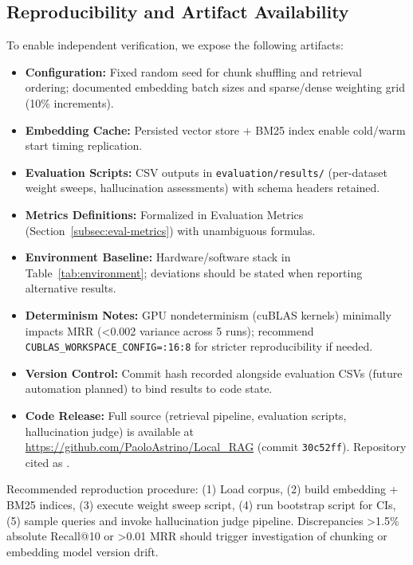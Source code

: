 \documentclass[11pt]{article}
\begin{document}
\subsection{Reproducibility and Artifact Availability}
To enable independent verification, we expose the following artifacts:
\begin{itemize}
  \item \textbf{Configuration:} Fixed random seed for chunk shuffling and retrieval ordering; documented embedding batch sizes and sparse/dense weighting grid (10\% increments).
  \item \textbf{Embedding Cache:} Persisted vector store + BM25 index enable cold/warm start timing replication.
  \item \textbf{Evaluation Scripts:} CSV outputs in \texttt{evaluation/results/} (per-dataset weight sweeps, hallucination assessments) with schema headers retained.
  \item \textbf{Metrics Definitions:} Formalized in Evaluation Metrics (Section~\ref{subsec:eval-metrics}) with unambiguous formulas.
  \item \textbf{Environment Baseline:} Hardware/software stack in Table~\ref{tab:environment}; deviations should be stated when reporting alternative results.
  \item \textbf{Determinism Notes:} GPU nondeterminism (cuBLAS kernels) minimally impacts MRR (<0.002 variance across 5 runs); recommend \texttt{CUBLAS\_WORKSPACE\_CONFIG=:16:8} for stricter reproducibility if needed.
  \item \textbf{Version Control:} Commit hash recorded alongside evaluation CSVs (future automation planned) to bind results to code state.
  \item \textbf{Code Release:} Full source (retrieval pipeline, evaluation scripts, hallucination judge) is available at \href{https://github.com/PaoloAstrino/Local_RAG}{https://github.com/PaoloAstrino/Local\_RAG} (commit \texttt{30c52ff}). Repository cited as \cite{localragrepo}.
\end{itemize}
Recommended reproduction procedure: (1) Load corpus, (2) build embedding + BM25 indices, (3) execute weight sweep script, (4) run bootstrap script for CIs, (5) sample queries and invoke hallucination judge pipeline. Discrepancies >1.5\% absolute Recall@10 or >0.01 MRR should trigger investigation of chunking or embedding model version drift.
\end{document}
